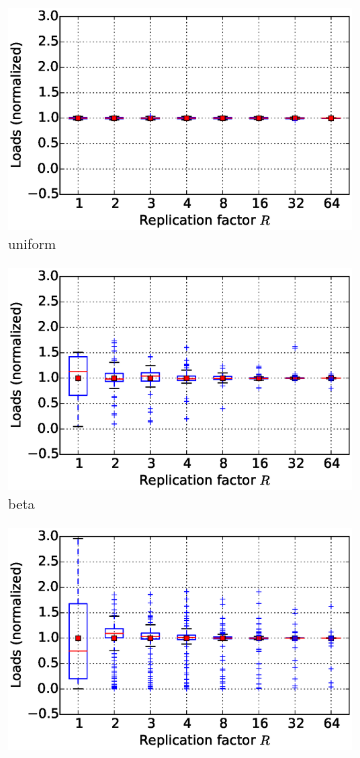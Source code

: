 \begin{figure}[!htbp]
\begin{subfigure}[b]{0.45\textwidth}
    \includegraphics[width=\linewidth]{figures/E45_simulation_imbalance_coarse_std_uniform.eps}
    \caption{uniform}
\end{subfigure}
\begin{subfigure}[b]{0.45\textwidth}
    \includegraphics[width=\linewidth]{figures/E45_simulation_imbalance_coarse_std_beta.eps}
    \caption{beta}
\end{subfigure}
\begin{subfigure}[b]{0.45\textwidth}
    \includegraphics[width=\linewidth]{figures/E45_simulation_imbalance_coarse_std_powerlaw.eps}

\end{subfigure}
\end{figure}
